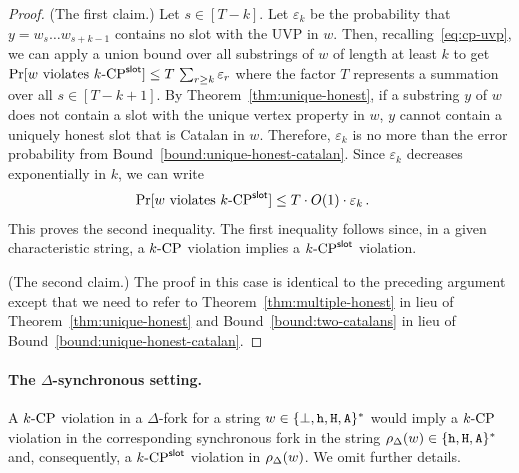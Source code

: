   \begin{proof}
    \newcommand{\EpsCat}{\mathsf{\varepsilon}}
    (The first claim.) 
    Let $s \in [T - k]$.
    Let $\EpsCat_{k}$ be 
    the probability that $y = w_s \ldots w_{s+k-1}$ contains no slot with the UVP in $w$. 
    Then, recalling~\eqref{eq:cp-uvp}, we can apply a union bound 
    over all substrings of $w$ of length at least $k$ to get 
    $
      \Pr[\text{$w$ violates $\kSlotCP$}] 
        \leq T\, \sum_{r \geq  k} \EpsCat_{r}
    $
    where the factor $T$ represents a summation over all $s \in [T - k + 1]$. 
    By Theorem~\ref{thm:unique-honest}, 
    if a substring $y$ of $w$ does not contain a slot with the unique vertex property in $w$, 
    $y$ cannot contain a uniquely honest slot that is Catalan in $w$.
    Therefore, $\EpsCat_k$ is no more than the error probability from Bound~\ref{bound:unique-honest-catalan}. 
    Since $\EpsCat_k$ decreases exponentially in $k$, 
    we can write 
    \begin{align*}
      \Pr[\text{$w$ violates $\kSlotCP$}] 
        &\leq T\cdot O(1) \cdot \EpsCat_{k}
        \,.
    \end{align*}
    This proves the second inequality. 
    The first inequality follows since, 
    in a given characteristic string, 
    a ${k}\text{-}\mathrm{CP}$ violation implies a ${k}\text{-}\mathrm{CP}^{\mathsf{slot}}$ violation.

    (The second claim.) 
    The proof in this case 
    is identical to the preceding argument except that 
    we need to refer to Theorem~\ref{thm:multiple-honest} in lieu of Theorem~\ref{thm:unique-honest}
    and Bound~\ref{bound:two-catalans} in lieu of Bound~\ref{bound:unique-honest-catalan}.
  \end{proof}
  \paragraph{The $\Delta$-synchronous setting.} 
  A ${k}\text{-}\mathrm{CP}$ violation in a $\Delta$-fork for a string $w \in \{\perp, \mathtt{h}, \mathtt{H}, \mathtt{A}\}^*$ 
  would imply 
  a ${k}\text{-}\mathrm{CP}$ violation in the corresponding synchronous fork 
  in the string $\rho_\Delta(w) \in \{\mathtt{h}, \mathtt{H}, \mathtt{A}\}^*$ 
  and, consequently, a ${k}\text{-}\mathrm{CP}^{\mathsf{slot}}$ violation in $\rho_\Delta(w)$. 
  We omit further details.
